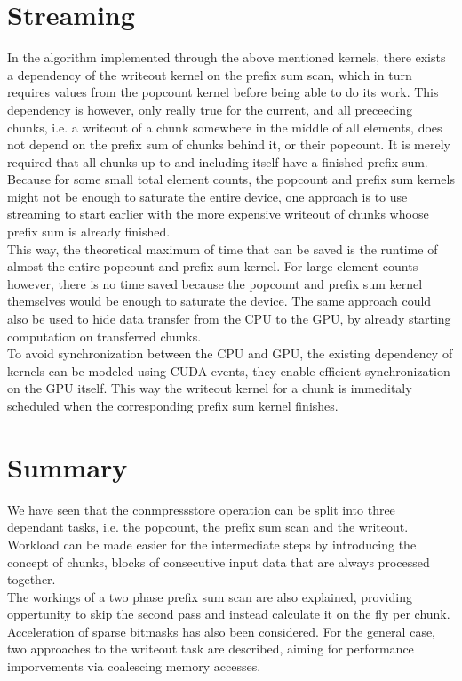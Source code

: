 \documentclass{tudscrreprt}
\begin{document}
		\section{Streaming}
			In the algorithm implemented through the above mentioned kernels, there exists a dependency of the writeout kernel on the prefix sum scan, which in turn requires values from the popcount kernel before being able to do its work. This dependency is however, only really true for the current, and all preceeding chunks, i.e. a writeout of a chunk somewhere in the middle of all elements, does not depend on the prefix sum of chunks behind it, or their popcount. It is merely required that all chunks up to and including itself have a finished prefix sum. \\
			Because for some small total element counts, the popcount and prefix sum kernels might not be enough to saturate the entire device, one approach is to use streaming to start earlier with the more expensive writeout of chunks whoose prefix sum is already finished. \\
			This way, the theoretical maximum of time that can be saved is the runtime of almost the entire popcount and prefix sum kernel. For large element counts however, there is no time saved because the popcount and prefix sum kernel themselves would be enough to saturate the device. The same approach could also be used to hide data transfer from the CPU to the GPU, by already starting computation on transferred chunks. \\
			
			To avoid synchronization between the CPU and GPU, the existing dependency of kernels can be modeled using CUDA events, they enable efficient synchronization on the GPU itself. This way the writeout kernel for a chunk is immeditaly scheduled when the corresponding prefix sum kernel finishes. \\
		
		\section{Summary}
			We have seen that the conmpressstore operation can be split into three dependant tasks, i.e. the popcount, the prefix sum scan and the writeout. Workload can be made easier for the intermediate steps by introducing the concept of chunks, blocks of consecutive input data that are always processed together. \\
			The workings of a two phase prefix sum scan are also explained, providing oppertunity to skip the second pass and instead calculate it on the fly per chunk. \\
			Acceleration of sparse bitmasks has also been considered. For the general case, two approaches to the writeout task are described, aiming for performance imporvements via coalescing memory accesses. \\
		
\end{document}
